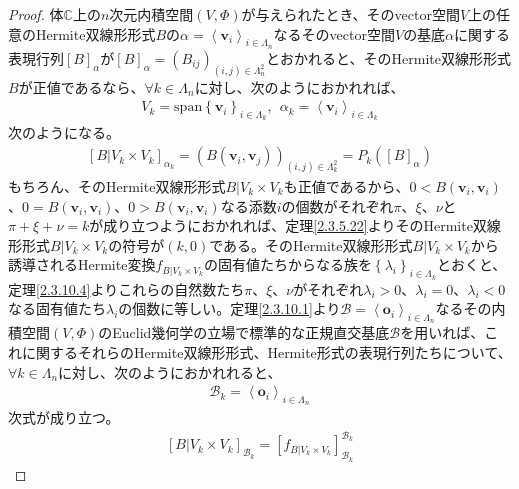 \documentclass[dvipdfmx]{jsarticle}
\begin{document}
\begin{proof}
体$\mathbb{C}$上の$n$次元内積空間$(V,\varPhi)$が与えられたとき、そのvector空間$V$上の任意のHermite双線形形式$B$の$\alpha = \left\langle \mathbf{v}_{i} \right\rangle_{i \in \varLambda_{n}}$なるそのvector空間$V$の基底$\alpha$に関する表現行列$[ B]_{\alpha}$が$[ B]_{\alpha} = \left( B_{ij} \right)_{(i,j) \in \varLambda_{n}^{2}}$とおかれると、そのHermite双線形形式$B$が正値であるなら、$\forall k \in \varLambda_{n}$に対し、次のようにおかれれば、
\begin{align*}
V_{k} = \mathrm{span}\left\{ \mathbf{v}_{i} \right\}_{i \in \varLambda_{k}},\ \ \alpha_{k} = \left\langle \mathbf{v}_{i} \right\rangle_{i \in \varLambda_{k}}
\end{align*}
次のようになる。
\begin{align*}
\left[ B|V_{k} \times V_{k} \right]_{\alpha_{k}} = \left( B\left( \mathbf{v}_{i},\mathbf{v}_{j} \right) \right)_{(i,j) \in \varLambda_{k}^{2}} = P_{k}\left( [ B]_{\alpha} \right)
\end{align*}
もちろん、そのHermite双線形形式$B|V_{k} \times V_{k}$も正値であるから、$0 < B\left( \mathbf{v}_{i},\mathbf{v}_{i} \right)$、$0 = B\left( \mathbf{v}_{i},\mathbf{v}_{i} \right)$、$0 > B\left( \mathbf{v}_{i},\mathbf{v}_{i} \right)$なる添数$i$の個数がそれぞれ$\pi$、$\xi$、$\nu$と$\pi + \xi + \nu = k$が成り立つようにおかれれば、定理\ref{2.3.5.22}よりそのHermite双線形形式$B|V_{k} \times V_{k}$の符号が$(k,0)$である。そのHermite双線形形式$B|V_{k} \times V_{k}$から誘導されるHermite変換$f_{B|V_{k} \times V_{k}}$の固有値たちからなる族を$\left\{ \lambda_{i} \right\}_{i \in \varLambda_{k}}$とおくと、定理\ref{2.3.10.4}よりこれらの自然数たち$\pi$、$\xi$、$\nu$がそれぞれ$\lambda_{i} > 0$、$\lambda_{i} = 0$、$\lambda_{i} < 0$なる固有値たち$\lambda_{i}$の個数に等しい。定理\ref{2.3.10.1}より$\mathcal{B} =\left\langle \mathbf{o}_{i} \right\rangle_{i \in \varLambda_{n}}$なるその内積空間$(V,\varPhi)$のEuclid幾何学の立場で標準的な正規直交基底$\mathcal{B}$を用いれば、これに関するそれらのHermite双線形形式、Hermite形式の表現行列たちについて、$\forall k \in \varLambda_{n}$に対し、次のようにおかれれると、
\begin{align*}
\mathcal{B}_{k} = \left\langle \mathbf{o}_{i} \right\rangle_{i \in \varLambda_{n}}
\end{align*}
次式が成り立つ。
\begin{align*}
\left[ B|V_{k} \times V_{k} \right]_{\mathcal{B}_{k}} = \left[ f_{B|V_{k} \times V_{k}} \right]_{\mathcal{B}_{k}}^{\mathcal{B}_{k}}
\end{align*}

\end{proof}
\end{document}
